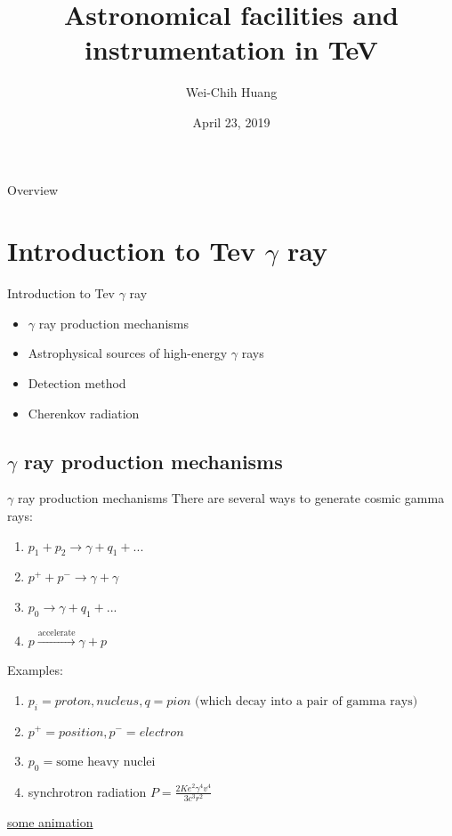 \documentclass{beamer}
\title[TeV Astrophysics]{Astronomical facilities and instrumentation in TeV}
\author{Wei-Chih Huang}
\institute[NTHU]{
National Tsing Hua University \\
\medskip
}
\date{April 23, 2019}
\begin{document}
\begin{frame}
	\titlepage %
\end{frame}

\begin{frame}{Overview}
	\tableofcontents
\end{frame}



\section{Introduction to Tev $\gamma$ ray}
\begin{frame}{Introduction to Tev $\gamma$ ray}
	\begin{itemize}
		\item $\gamma$ ray production mechanisms
		\item Astrophysical sources of high-energy $\gamma$ rays
		\item Detection method
		\item Cherenkov radiation
	\end{itemize}
\end{frame}


\subsection{$\gamma$ ray production mechanisms}
\begin{frame}{$\gamma$ ray production mechanisms}
	There are several ways to generate cosmic gamma rays:
	\begin{enumerate}
		\item $p_1 + p_2 \rightarrow \gamma + q_1 + ...$
		\item $p^+ + p^- \rightarrow \gamma + \gamma$
		\item $p_0 \rightarrow \gamma + q_1 + ...$
		\item $p \xrightarrow{\text{accelerate}} \gamma + p$
	\end{enumerate}

	Examples:
	\begin{enumerate}
		\item $p_i = proton, nucleus, q = pion \text{ (which decay into a pair of gamma rays)}$
		\item $p^+ = position, p^- = electron$
		\item $p_0 = \text{some heavy nuclei}$
		\item synchrotron radiation $P = \frac{2Ke^2 \gamma^4 v^4}{3c^3r^2} $
	\end{enumerate}
	\href{https://imagine.gsfc.nasa.gov/science/toolbox/gamma_generation.html}{some animation}
\end{frame}
\end{document}
